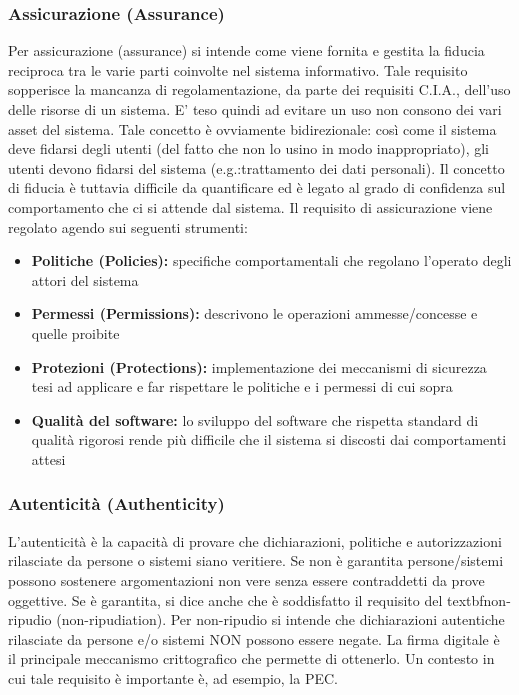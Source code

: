 \subsubsection{Assicurazione (Assurance)}
Per assicurazione (assurance) si intende come viene fornita e gestita la fiducia reciproca tra le varie parti coinvolte nel sistema informativo. Tale requisito sopperisce la mancanza di regolamentazione, da parte dei requisiti C.I.A., dell'uso delle risorse di un sistema. E' teso quindi ad evitare un uso non consono dei vari asset del sistema. Tale concetto è ovviamente bidirezionale: così come il sistema deve fidarsi degli utenti (del fatto che non lo usino in modo inappropriato), gli utenti devono fidarsi del sistema (e.g.:trattamento dei dati personali). Il concetto di fiducia è tuttavia difficile da quantificare ed è legato al grado di confidenza sul comportamento che ci si attende dal sistema. Il requisito di assicurazione viene regolato agendo sui seguenti strumenti:
\begin{itemize} 
  \item \textbf{Politiche (Policies):} specifiche comportamentali che regolano l’operato degli attori del sistema
  \item \textbf{Permessi (Permissions):} descrivono le operazioni ammesse/concesse e quelle proibite
  \item \textbf{Protezioni (Protections):} implementazione dei meccanismi di sicurezza tesi ad applicare e far rispettare le politiche e i permessi di cui sopra
  \item \textbf{Qualità del software:} lo sviluppo del software che rispetta standard di qualità rigorosi rende più difficile che il sistema si discosti dai comportamenti attesi 
\end{itemize}

\subsubsection{Autenticità (Authenticity)}
L’autenticità è la capacità di provare che dichiarazioni, politiche e autorizzazioni rilasciate da persone o sistemi siano veritiere. Se non è garantita persone/sistemi possono sostenere argomentazioni non vere senza essere contraddetti da prove oggettive. Se è garantita, si dice anche che è soddisfatto il requisito del textbf{non-ripudio (non-ripudiation)}. Per non-ripudio si intende che dichiarazioni autentiche rilasciate da persone e/o sistemi NON possono essere negate. La firma digitale è il principale meccanismo crittografico che permette di ottenerlo. Un contesto in cui tale requisito è importante è, ad esempio, la PEC.


